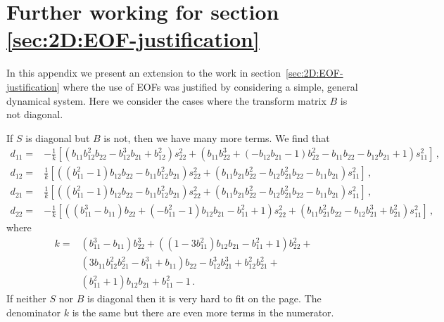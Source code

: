 
\chapter{Further working for section \ref{sec:2D:EOF-justification}}
\label{appendix:EOF-justification}
In this appendix we present an extension to the work in section~\ref{sec:2D:EOF-justification} where the use of EOFs was justified by considering a simple, general dynamical system. Here we consider the cases where the transform matrix $B$ is not diagonal.

If $S$ is diagonal but $B$ is not, then we have many more terms. We find that
{\small
\begin{align*}
d_{11}=&
-\frac{1}{k}\left[
(b_{11}b_{12}^2b_{22}-b_{12}^3b_{21}+b_{12}^2)s_{22}^2+(b_{11}b_{22}^3+(-b_{12}b_{21}-1)b_{22}^2-b_{11}b_{22}-b_{12}b_{21}+1)s_{11}^2
\right]\,,\\
d_{12}=&
\frac{1}{k}\left[
((b_{11}^2-1)b_{12}b_{22}-b_{11}b_{12}^2b_{21})s_{22}^2+
(b_{11}b_{21}b_{22}^2-b_{12}b_{21}^2b_{22}-b_{11}b_{21})s_{11}^2
\right]\,,\\
d_{21}=&
\frac{1}{k}\left[
((b_{11}^2-1)b_{12}b_{22}-b_{11}b_{12}^2b_{21})s_{22}^2+
(b_{11}b_{21}b_{22}^2-b_{12}b_{21}^2b_{22}-b_{11}b_{21})s_{11}^2
\right]\,,\\
d_{22}=&
-\frac{1}{k}\left[
((b_{11}^3-b_{11})b_{22}+(-b_{11}^2-1)b_{12}b_{21}-b_{11}^2+1)s_{22}^2+
(b_{11}b_{21}^2b_{22}-b_{12}b_{21}^3+b_{21}^2)s_{11}^2
\right]\,,
\end{align*} 
}
where 
\begin{align*}
k =& (b_{11}^3-b_{11})b_{22}^3+
((1-3b_{11}^2)b_{12}b_{21}-b_{11}^2+1)b_{22}^2+\\
& (3b_{11}b_{12}^2b_{21}^2-b_{11}^3+b_{11})b_{22}-b_{12}^3b_{21}^3+b_{12}^2b_{21}^2+\\
& (b_{11}^2+1)b_{12}b_{21}+b_{11}^2-1\,.
\end{align*}
If neither $S$ nor $B$ is diagonal then it is very hard to fit on the page. The denominator $k$ is the same but there are even more terms in the numerator.



